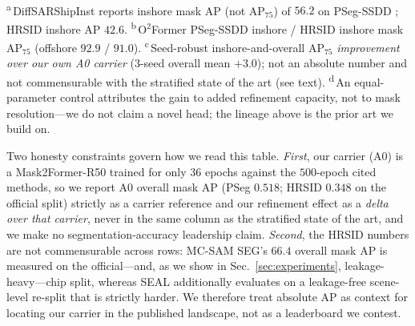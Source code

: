 \documentclass[journal]{IEEEtran}
\begin{document}
\begin{table}[t]
\begin{tabular}{@{}llcccc@{}}
\bottomrule
\end{tabular}
\\[2pt]
\raggedright\footnotesize
\textsuperscript{a}\,DiffSARShipInst reports inshore mask AP (not AP$_{75}$) of $56.2$ on PSeg-SSDD \cite{xu2025diffsarshipinst}; HRSID inshore AP $42.6$.
\textsuperscript{b}\,O$^2$Former PSeg-SSDD inshore / HRSID inshore mask AP$_{75}$ \cite{gao2025o2former} (offshore $92.9$ / $91.0$).
\textsuperscript{c}\,Seed-robust inshore-and-overall AP$_{75}$ \emph{improvement over our own A0 carrier} (3-seed overall mean $+3.0$); not an absolute number and not commensurable with the stratified state of the art (see text).
\textsuperscript{d}\,An equal-parameter control attributes the gain to added refinement capacity, not to mask resolution---we do not claim a novel head; the lineage above is the prior art we build on.
\end{table}

Two honesty constraints govern how we read this table. \emph{First}, our carrier (A0) is a Mask2Former-R50 trained for only $36$ epochs against the $500$-epoch cited methods, so we report A0 overall mask AP (PSeg $0.518$; HRSID $0.348$ on the official split) strictly as a carrier reference and our refinement effect as a \emph{delta over that carrier}, never in the same column as the stratified state of the art, and we make no segmentation-accuracy leadership claim. \emph{Second}, the HRSID numbers are not commensurable across rows: MC-SAM SEG's $66.4$ overall mask AP \cite{zheng2024mcsamseg} is measured on the official---and, as we show in Sec.~\ref{sec:experiments}, leakage-heavy---chip split, whereas SEAL additionally evaluates on a leakage-free scene-level re-split that is strictly harder. We therefore treat absolute AP as context for locating our carrier in the published landscape, not as a leaderboard we contest.
\end{document}
